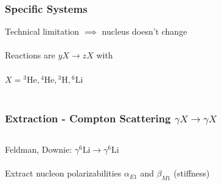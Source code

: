 \documentclass{beamer}
\newcommand{\LiS}{{}^{6} \mathrm{Li} }
\newcommand{\HeF}{{}^{4} \mathrm{He}}
\newcommand{\HeT}{{}^{3} \mathrm{He}}
\begin{document}
\begin{frame}\frametitle{Specific Systems}
\begin{center}
    Technical limitation $\implies$ nucleus doesn't change\\~\\
    Reactions are $yX \to zX$ with \\~\\
    $X= \HeT, \HeF, {}^3 \mathrm{H}, \LiS$\\~\\
\end{center}
\end{frame}



\begin{frame}\frametitle{Extraction - Compton Scattering $\gamma X \to \gamma X$} 
\begin{columns}
    \begin{column}{.5\textwidth}
    Feldman, Downie: $\gamma \LiS \to \gamma \LiS$\\~\\
    Extract nucleon polarizabilities $\alpha_{E1}$ and $\beta_{M1}$ (stiffness)\\~\\


\end{column}
\end{columns}
\end{frame}
\end{document}
